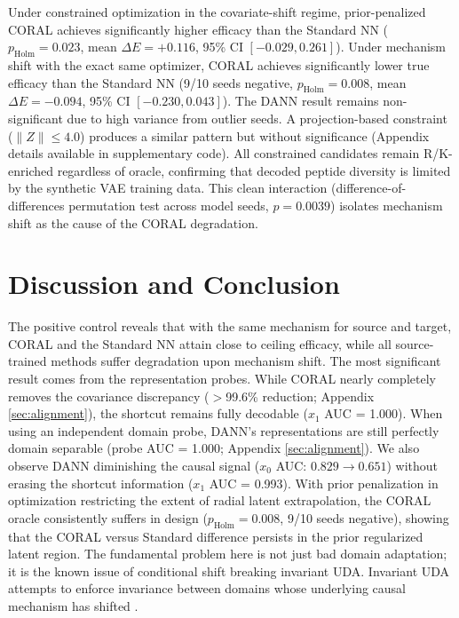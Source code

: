 \documentclass{article}
\begin{document}
Under constrained optimization in the covariate-shift regime, prior-penalized CORAL achieves significantly higher efficacy than the Standard NN ($p_{\text{Holm}} = 0.023$, mean $\Delta E = +0.116$, 95\% CI $[-0.029, 0.261]$). Under mechanism shift with the exact same optimizer, CORAL achieves significantly lower true efficacy than the Standard NN (9/10 seeds negative, $p_{\text{Holm}} = 0.008$, mean $\Delta E = -0.094$, 95\% CI $[-0.230, 0.043]$). The DANN result remains non-significant due to high variance from outlier seeds. A projection-based constraint ($\|Z\| \leq 4.0$) produces a similar pattern but without significance (Appendix details available in supplementary code). All constrained candidates remain R/K-enriched regardless of oracle, confirming that decoded peptide diversity is limited by the synthetic VAE training data. This clean interaction (difference-of-differences permutation test across model seeds, $p = 0.0039$) isolates mechanism shift as the cause of the CORAL degradation.


\label{sec:discussion}
\section{Discussion and Conclusion}
The positive control reveals that with the same mechanism for source and target, CORAL and the Standard NN attain close to ceiling efficacy, while all source-trained methods suffer degradation upon mechanism shift. The most significant result comes from the representation probes. While CORAL nearly completely removes the covariance discrepancy ($>$99.6\% reduction; Appendix \ref{sec:alignment}), the shortcut remains fully decodable ($x_1$ AUC = 1.000). When using an independent domain probe, DANN's representations are still perfectly domain separable (probe AUC = 1.000; Appendix \ref{sec:alignment}). We also observe DANN diminishing the causal signal ($x_0$ AUC: $0.829 \to 0.651$) without erasing the shortcut information ($x_1$ AUC = 0.993). With prior penalization in optimization restricting the extent of radial latent extrapolation, the CORAL oracle consistently suffers in design ($p_{\text{Holm}} = 0.008$, 9/10 seeds negative), showing that the CORAL versus Standard difference persists in the prior regularized latent region. The fundamental problem here is not just bad domain adaptation; it is the known issue of conditional shift breaking invariant UDA. Invariant UDA attempts to enforce invariance between domains whose underlying causal mechanism has shifted \cite{zhao2019learning}.
\end{document}

